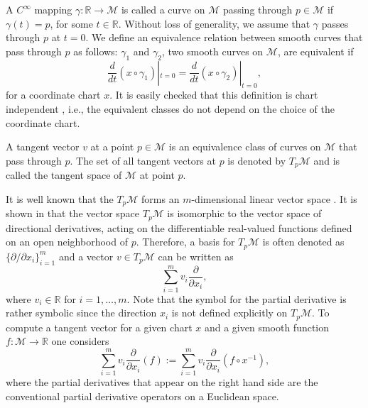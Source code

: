 A $C^{\infty}$ mapping $\gamma:\mathbb R \to \mathcal M$ is called a curve on $\mathcal M$ passing through $p\in \mathcal M$ if $\gamma(t) = p$, for some $t\in \mathbb R$. Without loss of generality, we assume that $\gamma$ passes through $p$ at $t=0$. We define an equivalence relation between smooth curves that pass through $p$ as follows: $\gamma_1$ and $\gamma_2$, two smooth curves on $\mathcal M$, are equivalent if
\begin{equation} \label{eq:2.1}
	\frac{d}{dt}(x\circ \gamma_1)|_{t=0} = \frac{d}{dt}(x\circ \gamma_2)|_{t=0},
\end{equation}
for a coordinate chart $x$. It is easily checked that this definition is chart independent \cite{abraham1978foundations}, i.e., the equivalent classes do not depend on the choice of the coordinate chart.
\begin{definition}
A tangent vector $v$ at a point $p\in \mathcal M$ is an equivalence class of curves on $\mathcal M$ that pass through $p$. The set of all tangent vectors at $p$ is denoted by $T_p\mathcal M$ and is called the tangent space of $\mathcal M$ at point $p$.
\end{definition}
It is well known that the $T_p\mathcal M$ forms an $m$-dimensional linear vector space \cite{abraham1978foundations,robbin2011introduction}. It is shown in \cite{abraham1978foundations,robbin2011introduction} that the vector space $T_p\mathcal M$ is isomorphic to the vector space of directional derivatives, acting on the differentiable real-valued functions defined on an open neighborhood of $p$. Therefore, a basis for $T_p\mathcal M$ is often denoted as $\{ \partial /\partial x_i \}_{i=1}^{m}$ and a vector $v\in T_p\mathcal M$ can be written as 
\begin{equation} \label{eq:2.11}
	\sum_{i=1}^m v_i \frac{\partial}{\partial x_i},
\end{equation}
where $v_i\in \mathbb R$ for $i = 1,\dots,m$. Note that the symbol for the partial derivative is rather symbolic since the direction $x_i$ is not defined explicitly on $T_p\mathcal M$. To compute a tangent vector for a given chart $x$ and a given smooth function $f:\mathcal M \to \mathbb R$ one considers
\begin{equation} \label{eq:2.12}
	\sum_{i=1}^m v_i \frac{\partial}{\partial x_i} (f) := \sum_{i=1}^m v_i \frac{\partial}{\partial x_i} (f \circ x^{-1}),
\end{equation}
where the partial derivatives that appear on the right hand side are the conventional partial derivative operators on a Euclidean space.

